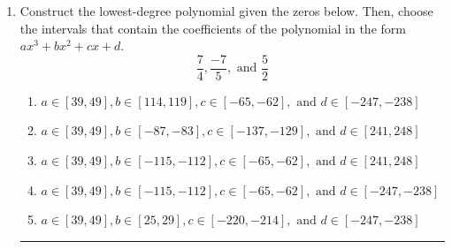\documentclass[14pt]{extbook}
\newcommand{\litem}[1]{\item#1\hspace*{-1cm}\rule{\textwidth}{0.4pt}}
\begin{document}
\begin{enumerate}
\litem{
Construct the lowest-degree polynomial given the zeros below. Then, choose the intervals that contain the coefficients of the polynomial in the form $ax^3+bx^2+cx+d$.\[ \frac{7}{4}, \frac{-7}{5}, \text{ and } \frac{5}{2} \]\begin{enumerate}[label=\Alph*.]
\item \( a \in [39, 49], b \in [114, 119], c \in [-65, -62], \text{ and } d \in [-247, -238] \)
\item \( a \in [39, 49], b \in [-87, -83], c \in [-137, -129], \text{ and } d \in [241, 248] \)
\item \( a \in [39, 49], b \in [-115, -112], c \in [-65, -62], \text{ and } d \in [241, 248] \)
\item \( a \in [39, 49], b \in [-115, -112], c \in [-65, -62], \text{ and } d \in [-247, -238] \)
\item \( a \in [39, 49], b \in [25, 29], c \in [-220, -214], \text{ and } d \in [-247, -238] \)


\end{enumerate}}
\end{enumerate}
\end{document}
